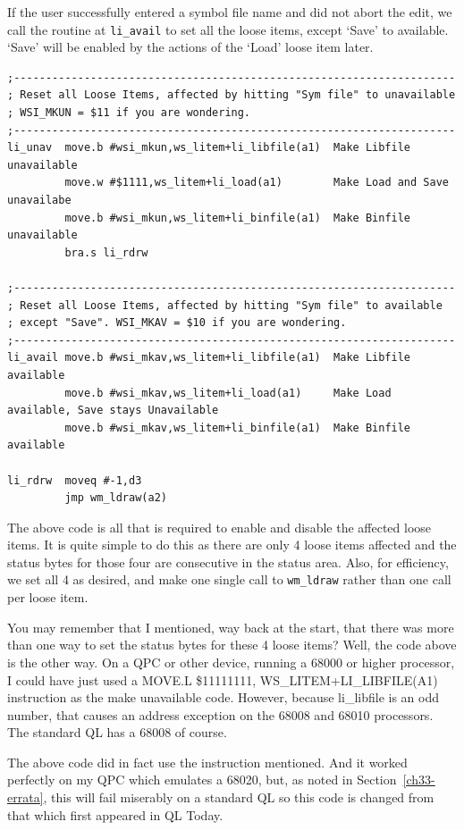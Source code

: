 If the user successfully entered a symbol file name and did not
    abort the edit, we call the routine at \texttt{li\_avail} to
    set all the loose items, except `Save' to available. `Save' will be
    enabled by the actions of the `Load' loose item later.

\begin{lstlisting}[firstnumber=1,]
;---------------------------------------------------------------------
; Reset all Loose Items, affected by hitting "Sym file" to unavailable
; WSI_MKUN = $11 if you are wondering.
;---------------------------------------------------------------------
li_unav  move.b #wsi_mkun,ws_litem+li_libfile(a1)  Make Libfile unavailable
         move.w #$1111,ws_litem+li_load(a1)        Make Load and Save unavailabe
         move.b #wsi_mkun,ws_litem+li_binfile(a1)  Make Binfile unavailable
         bra.s li_rdrw

;---------------------------------------------------------------------
; Reset all Loose Items, affected by hitting "Sym file" to available
; except "Save". WSI_MKAV = $10 if you are wondering.
;---------------------------------------------------------------------
li_avail move.b #wsi_mkav,ws_litem+li_libfile(a1)  Make Libfile available
         move.b #wsi_mkav,ws_litem+li_load(a1)     Make Load available, Save stays Unavailable
         move.b #wsi_mkav,ws_litem+li_binfile(a1)  Make Binfile available

li_rdrw  moveq #-1,d3
         jmp wm_ldraw(a2) 
\end{lstlisting}

The above code is all that is required to enable and disable the
    affected loose items. It is quite simple to do this as there are only 4
    loose items affected and the status bytes for those four are consecutive
    in the status area. Also, for efficiency, we set all 4 as desired, and
    make one single call to \texttt{wm\_ldraw} rather than one call
    per loose item.

\begin{note}
You may remember that I mentioned, way back at the start, that
      there was more than one way to set the status bytes for these 4 loose
      items? Well, the code above is the other way. On a QPC or other device,
      running a 68000 or higher processor, I could have just used a MOVE.L
      \$11111111, WS\_LITEM+LI\_LIBFILE(A1) instruction as the make unavailable
      code. However, because li\_libfile is an odd number, that causes an
      address exception on the 68008 and 68010 processors. The standard QL has
      a 68008 of course.

The above code did in fact use the instruction mentioned. And it
      worked perfectly on my QPC which emulates a 68020, but, as noted in
 Section~\ref{ch33-errata}, this will fail miserably on a standard
      QL so this code is changed from that which first appeared in QL
      Today.
\end{note}

